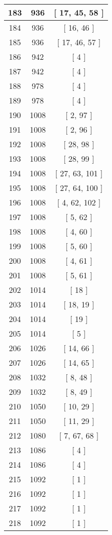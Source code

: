\begin{center}
\begin{longtable}[H]{|| c c c ||}
\hline
183 & 936 & [ 17, 45, 58 ] \\ 
\hline
184 & 936 & [ 16, 46 ] \\ 
\hline
185 & 936 & [ 17, 46, 57 ] \\ 
\hline
186 & 942 & [ 4 ] \\ 
\hline
187 & 942 & [ 4 ] \\ 
\hline
188 & 978 & [ 4 ] \\ 
\hline
189 & 978 & [ 4 ] \\ 
\hline
190 & 1008 & [ 2, 97 ] \\ 
\hline
191 & 1008 & [ 2, 96 ] \\ 
\hline
192 & 1008 & [ 28, 98 ] \\ 
\hline
193 & 1008 & [ 28, 99 ] \\ 
\hline
194 & 1008 & [ 27, 63, 101 ] \\ 
\hline
195 & 1008 & [ 27, 64, 100 ] \\ 
\hline
196 & 1008 & [ 4, 62, 102 ] \\ 
\hline
197 & 1008 & [ 5, 62 ] \\ 
\hline
198 & 1008 & [ 4, 60 ] \\ 
\hline
199 & 1008 & [ 5, 60 ] \\ 
\hline
200 & 1008 & [ 4, 61 ] \\ 
\hline
201 & 1008 & [ 5, 61 ] \\ 
\hline
202 & 1014 & [ 18 ] \\ 
\hline
203 & 1014 & [ 18, 19 ] \\ 
\hline
204 & 1014 & [ 19 ] \\ 
\hline
205 & 1014 & [ 5 ] \\ 
\hline
206 & 1026 & [ 14, 66 ] \\ 
\hline
207 & 1026 & [ 14, 65 ] \\ 
\hline
208 & 1032 & [ 8, 48 ] \\ 
\hline
209 & 1032 & [ 8, 49 ] \\ 
\hline
210 & 1050 & [ 10, 29 ] \\ 
\hline
211 & 1050 & [ 11, 29 ] \\ 
\hline
212 & 1080 & [ 7, 67, 68 ] \\ 
\hline
213 & 1086 & [ 4 ] \\ 
\hline
214 & 1086 & [ 4 ] \\ 
\hline
215 & 1092 & [ 1 ] \\ 
\hline
216 & 1092 & [ 1 ] \\ 
\hline
217 & 1092 & [ 1 ] \\ 
\hline
218 & 1092 & [ 1 ] \\ 

\end{longtable}
\end{center}

